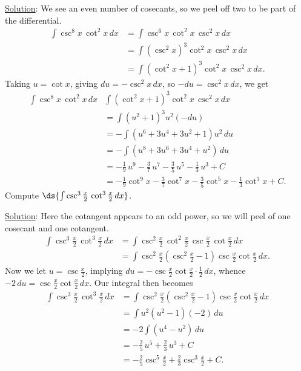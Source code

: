 \underline{Solution}: We see an even number of cosecants, so
we peel off two to be part of the differential.
\begin{align*}
\int\csc^8x\,\cot^2x\,dx&=\int\csc^6x\,\cot^2x\,\csc^2x\,dx\\
    &=\int\left(\csc^2x\right)^3\cot^2x\,\csc^2x\,dx\\
    &=\int\left(\cot^2x+1\right)^3\cot^2x\,\csc^2x\,dx.
\end{align*} 
Taking $u=\cot x$, giving $du=-\csc^2x\,dx$, so $-du=\csc^2x\,dx$,
we get
\begin{align*}
\int\csc^8x\,\cot^2x\,dx&\int\left(\cot^2x+1\right)^3\cot^2x\,\csc^2x\,dx\\
         &=\int\left(u^2+1\right)^3u^2(-du)\\
         &=-\int\left(u^6+3u^4+3u^2+1\right)u^2\,du\\
         &=-\int\left(u^8+3u^6+3u^4+u^2\right)\,du\\
         &=-\frac19\,u^9-\frac37\,u^7-\frac35\,u^5-\frac13\,u^3+C\\
         &=-\frac19\cot^9x-\frac37\cot^7x-\frac35\cot^5x-\frac13\cot^3x+C.
\end{align*}
\eex
\bex Compute $\ds{\int\csc^3\frac{x}2\,\cot^3\frac{x}2\,dx}$.

\underline{Solution}: Here the cotangent appears to an odd
power, so we will peel of one cosecant and one cotangent.
\begin{align*}
\int\csc^3\frac{x}2\,\cot^3\frac{x}2\,dx
  &=\int\csc^2\frac{x}2\,\cot^2\frac{x}2\,\csc\frac{x}2\,\cot\frac{x}2\,dx\\
  &=\int\csc^2\frac{x}2\left(\csc^2\frac{x}2-1\right)
          \csc\frac{x}2\cot\frac{x}2\,dx.
\end{align*}
Now we let $u=\csc\frac{x}2$, implying
$du=-\csc\frac{x}2\cot\frac{x}2\cdot\frac12\,dx$,
whence
$-2\,du=\csc\frac{x}2\cot\frac{x}2\,dx$.
Our integral then becomes
\begin{align*}
\int\csc^3\frac{x}2\,\cot^3\frac{x}2\,dx
 &=\int\csc^2\frac{x}2\left(\csc^2\frac{x}2-1\right)
          \csc\frac{x}2\cot\frac{x}2\,dx\\
 &=\int u^2\left(u^2-1\right)(-2)\,du\\
 &=-2\int\left(u^4-u^2\right)\,du\\
 &=-\frac25\,u^5+\frac23\,u^3+C\\
 &=-\frac25\csc^5\frac{x}2+\frac23\csc^3\frac{x}2+C.
\end{align*}
\eex

